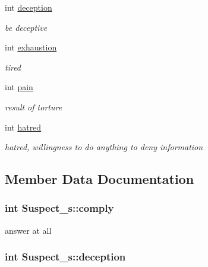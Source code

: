 \begin{DoxyCompactItemize}
int \hyperlink{struct_suspect__s_a7480c1e6ea9e13fc672be23178e7802b}{deception}
\begin{DoxyCompactList}\small\item\em be deceptive \end{DoxyCompactList}\item 
int \hyperlink{struct_suspect__s_a138b9d4dc4a3dc4f897ea2986fdc337a}{exhaustion}
\begin{DoxyCompactList}\small\item\em tired \end{DoxyCompactList}\item 
int \hyperlink{struct_suspect__s_a7b6fc79ab716033592c1f3b0e8797e57}{pain}
\begin{DoxyCompactList}\small\item\em result of torture \end{DoxyCompactList}\item 
int \hyperlink{struct_suspect__s_aaf6a1c91ce381e01b2bee299bec337dc}{hatred}
\begin{DoxyCompactList}\small\item\em hatred, willingness to do anything to deny information \end{DoxyCompactList}\end{DoxyCompactItemize}


\subsection{Member Data Documentation}
\hypertarget{struct_suspect__s_a8f5208d18939f62750ffe03a479023ff}{
\subsubsection[{comply}]{\setlength{\rightskip}{0pt plus 5cm}int Suspect\+\_\+s\+::comply}}\label{struct_suspect__s_a8f5208d18939f62750ffe03a479023ff}


answer at all 

\hypertarget{struct_suspect__s_a7480c1e6ea9e13fc672be23178e7802b}{
\subsubsection[{deception}]{\setlength{\rightskip}{0pt plus 5cm}int Suspect\+\_\+s\+::deception}}\label{struct_suspect__s_a7480c1e6ea9e13fc672be23178e7802b}


